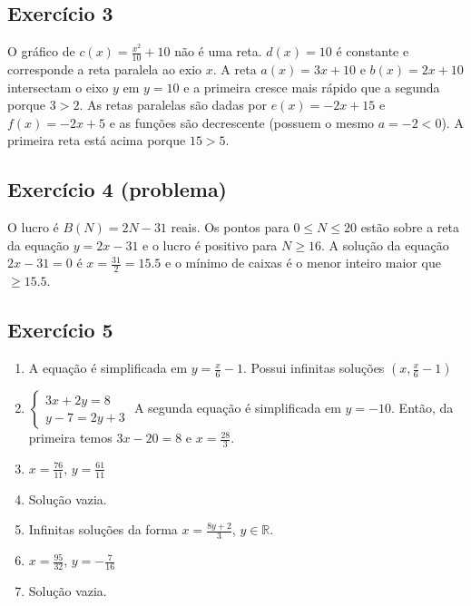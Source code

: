 \subsection*{Exercício 3}

O gráfico de $c(x)=\frac{x^2}{10} + 10$ não é uma reta.
$d(x) = 10$ é constante e corresponde a reta paralela ao exio $x$.
A reta $a(x) = 3x+10$ e $b(x) = 2x+10$ intersectam o eixo $y$ em
$y = 10$ e a primeira cresce mais rápido que a segunda porque $3 > 2$.
As retas paralelas são dadas por $e(x) = -2x+15$ e $f(x) = -2x+5$ e as
funções são decrescente (possuem o mesmo $a=-2 < 0$). A primeira reta está
acima porque $15 > 5$.

\subsection*{Exercício 4 (problema)}

O lucro é $B(N) = 2N - 31$ reais.
Os pontos para $0 \leq N \leq 20$ estão
sobre a reta da equação $y = 2x - 31$ e o lucro é positivo para
$N \geq 16$. A solução da equação $2x - 31 = 0$ é
$x = \frac{31}{2} = 15.5$ e o mínimo de caixas é o menor inteiro maior que
$\geq 15.5$.

\begin{center}
\end{center}

\subsection*{Exercício 5}

\begin{enumerate}
\item A equação é simplificada em $y = \frac{x}{6} - 1$. Possui infinitas
  soluções ${(x, \frac{x}{6} - 1)}$
\item $\left\{\begin{aligned}
  3x + 2y = 8 \\
  y - 7 = 2y + 3
\end{aligned}\right.$ A segunda equação é simplificada em $y = -10$.
  Então, da primeira temos $3x - 20 = 8$ e $x = \frac{28}{3}$.
\item $x = \frac{76}{11}$, $y = \frac{61}{11}$
\item Solução vazia.
\item Infinitas soluções da forma $x=\frac{8y+2}{3}$, $y \in {\mathbb R}$.
\item $x = \frac{95}{32}$, $y = -\frac{7}{16}$
\item Solução vazia.
\end{enumerate}

